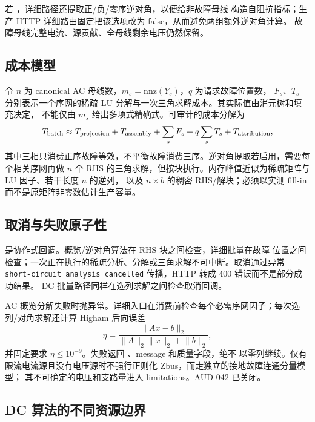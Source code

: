 若 ，详细路径还提取正/负/零序逆对角，以便给非故障母线
构造自阻抗指标；生产 HTTP 详细路由固定把该选项改为 false，从而避免两组额外逆对角计算。
故障母线完整电流、源贡献、全母线剩余电压仍然保留。

\subsection{成本模型}

令 $n$ 为 canonical AC 母线数，$m_s=\mathrm{nnz}(Y_s)$，$q$ 为请求故障位置数，
$F_s$、$T_s$ 分别表示一个序网的稀疏 LU 分解与一次三角求解成本。其实际值由消元树和填充决定，
不能仅由 $m_s$ 给出多项式精确式。可审计的成本分解为
\begin{equation}
T_{\rm batch}\approx T_{\rm projection}+T_{\rm assembly}
+\sum_s F_s+q\sum_s T_s+T_{\rm attribution},
\end{equation}
其中三相只消费正序故障等效，不平衡故障消费三序。逆对角提取若启用，需要每个相关序网再做
$n$ 个 RHS 的三角求解，但按块执行。内存峰值近似为稀疏矩阵与 LU 因子、若干长度 $n$ 的逆列，
以及 $n\times b$ 的稠密 RHS/解块；必须以实测 fill-in 而不是原矩阵非零数估计生产容量。

\subsection{取消与失败原子性}

 是协作式回调。概览/逆对角算法在 RHS 块之间检查，详细批量在故障
位置之间检查；一次正在执行的稀疏分析、分解或三角求解不可中断。取消通过异常
\texttt{short-circuit analysis cancelled} 传播，HTTP 转成 400 错误而不是部分成功结果。
DC 批量路径同样在选列求解之间检查取消回调。

AC 概览分解失败时抛异常。详细入口在消费前检查每个必需序网因子；每次选列/对角求解还计算
Higham 后向误差
\begin{equation}
 \eta=\frac{\lVert Ax-b\rVert_2}{\lVert A\rVert_2\lVert x\rVert_2+\lVert b\rVert_2},
\end{equation}
并固定要求 $\eta\le10^{-9}$。失败返回 、message 和质量字段，绝不
以零列继续。仅有限流电流源且没有电压源时不强行正则化 Zbus，而走独立的接地故障连通分量模型；
其不可确定的电压和支路量进入 limitations。AUD-042 已关闭。

\subsection{DC 算法的不同资源边界}

